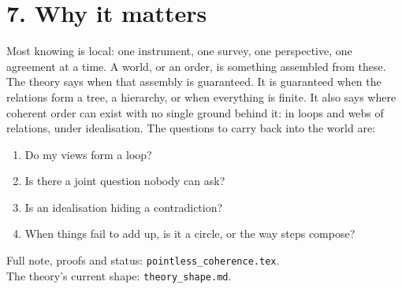 \documentclass[11pt]{article}
\begin{document}
\section*{7. Why it matters}
Most knowing is local: one instrument, one survey, one perspective, one
agreement at a time. A world, or an order, is something assembled from these.
The theory says when that assembly is guaranteed. It is guaranteed when the
relations form a tree, a hierarchy, or when everything is finite. It also says
where coherent order can exist with no single ground behind it: in loops and
webs of relations, under idealisation. The questions to carry back into the
world are:
\begin{enumerate}[nosep]
  \item Do my views form a loop?
  \item Is there a joint question nobody can ask?
  \item Is an idealisation hiding a contradiction?
  \item When things fail to add up, is it a circle, or the way steps compose?
\end{enumerate}

\medskip
\noindent\small Full note, proofs and status: \texttt{pointless\_coherence.tex}.\\
The theory's current shape: \texttt{theory\_shape.md}.
\end{document}
